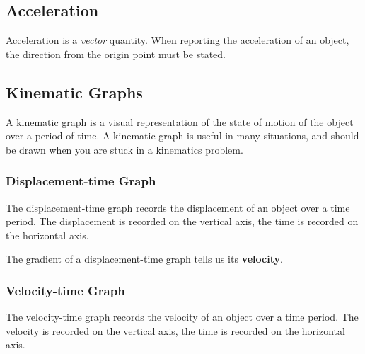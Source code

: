 \documentclass[../main.tex]{subfiles}
\begin{document}
		\subsection{Acceleration}
		Acceleration is a \textit{vector} quantity. When reporting the acceleration of an object, the direction from the origin point must be stated.
		
		\subsection{Kinematic Graphs}
		A kinematic graph is a visual representation of the state of motion of the object over a period of time. A kinematic graph is useful in many situations, and should be drawn when you are stuck in a kinematics problem.
		
		\subsubsection{Displacement-time Graph}
		The displacement-time graph records the displacement of an object over a time period. The displacement is recorded on the vertical axis, the time is recorded on the horizontal axis.
		
		\begin{center}
		\end{center}
		
		The gradient of a displacement-time graph tells us its \textbf{velocity}.
		
		\subsubsection{Velocity-time Graph}	
		The velocity-time graph records the velocity of an object over a time period. The velocity is recorded on the vertical axis, the time is recorded on the horizontal axis.
		
\end{document}
